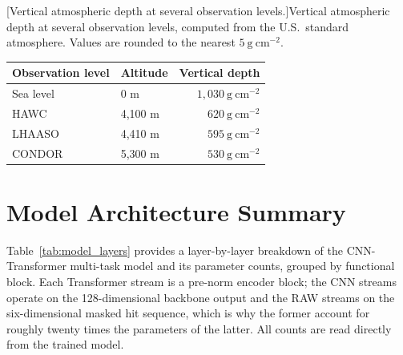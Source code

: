\begin{center}
\begin{minipage}{\linewidth}
\centering
{}[Vertical atmospheric depth at several observation levels.]{Vertical atmospheric depth at several observation levels, computed from the U.S.\ standard atmosphere. Values are rounded to the nearest $5 \ \mathrm{g \ cm}^{-2}$.}
\label{tab:atmospheric_depths}
\setlength{\tabcolsep}{8pt}
\renewcommand{\arraystretch}{1.2}
\begin{tabular}{llr}
\toprule
\textbf{Observation level} & \textbf{Altitude} & \textbf{Vertical depth} \\
\midrule
Sea level & 0 m & $1{,}030 \ \mathrm{g \ cm}^{-2}$ \\
HAWC & 4,100 m & $620 \ \mathrm{g \ cm}^{-2}$ \\
LHAASO & 4,410 m & $595 \ \mathrm{g \ cm}^{-2}$ \\
CONDOR & 5,300 m & $530 \ \mathrm{g \ cm}^{-2}$ \\
\bottomrule
\end{tabular}
\end{minipage}
\end{center}

\section{Model Architecture Summary} \label{sec:apx_architecture}

Table~\ref{tab:model_layers} provides a layer-by-layer breakdown of the CNN-Transformer multi-task model and its parameter counts, grouped by functional block. Each Transformer stream is a pre-norm encoder block; the CNN streams operate on the 128-dimensional backbone output and the RAW streams on the six-dimensional masked hit sequence, which is why the former account for roughly twenty times the parameters of the latter. All counts are read directly from the trained model.

